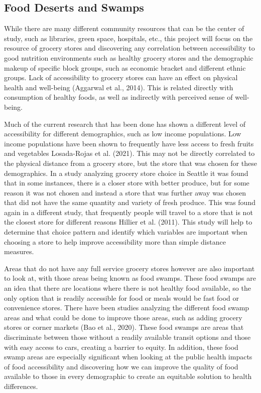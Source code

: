 \documentclass[
  letterpaper,
  DIV=11,
  numbers=noendperiod]{scrreport}
\begin{document}
\hypertarget{food-deserts-and-swamps}{%
\subsection{Food Deserts and Swamps}\label{food-deserts-and-swamps}}

While there are many different community resources that can be the
center of study, such as libraries, green space, hospitals, etc., this
project will focus on the resource of grocery stores and discovering any
correlation between accessibility to good nutrition environments such as
healthy grocery stores and the demographic makeup of specific block
groups, such as economic bracket and different ethnic groups. Lack of
accessibility to grocery stores can have an effect on physical health
and well-being (Aggarwal et al., 2014). This is related directly with
consumption of healthy foods, as well as indirectly with perceived sense
of well-being.

Much of the current research that has been done has shown a different
level of accessibility for different demographics, such as low income
populations. Low income populations have been shown to frequently have
less access to fresh fruits and vegetables Losada-Rojas et al. (2021).
This may not be directly correlated to the physical distance from a
grocery store, but the store that was chosen for these demographics. In
a study analyzing grocery store choice in Seattle it was found that in
some instances, there is a closer store with better produce, but for
some reason it was not chosen and instead a store that was further away
was chosen that did not have the same quantity and variety of fresh
produce. This was found again in a different study, that frequently
people will travel to a store that is not the closest store for
different reasons Hillier et al. (2011). This study will help to
determine that choice pattern and identify which variables are important
when choosing a store to help improve accessibility more than simple
distance measures.

Areas that do not have any full service grocery stores however are also
important to look at, with those areas being known as food swamps. These
food swamps are an idea that there are locations where there is not
healthy food available, so the only option that is readily accessible
for food or meals would be fast food or convenience stores. There have
been studies analyzing the different food swamp areas and what could be
done to improve those areas, such as adding grocery stores or corner
markets (Bao et al., 2020). These food swamps are areas that
discriminate between those without a readily available transit options
and those with easy access to cars, creating a barrier to equity. In
addition, these food swamp areas are especially significant when looking
at the public health impacts of food accessibility and discovering how
we can improve the quality of food available to those in every
demographic to create an equitable solution to health differences.
\end{document}

